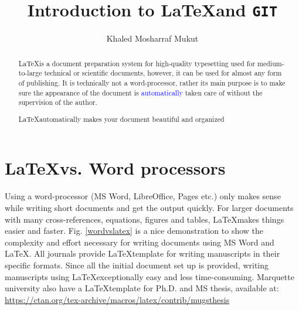 \documentclass[a4paper, 12pt, one column]{article}
\title{Introduction to \LaTeX \space and \texttt{GIT}}
\author{Khaled Mosharraf Mukut}
\begin{document}
\maketitle

\begin{abstract}

    \LaTeX is a document preparation system for high-quality typesetting used for medium-to-large technical or scientific documents, however,  it can be used for almost any form of publishing. It is technically not a word-processor, rather its main purpose is to make sure the appearance of the document is \textcolor{blue}{automatically} taken care of without the supervision of the author. 
    
    \vspace{0.3cm}

     {
            {
            \begin{minipage}{0.8\textwidth}
                \centering
               \LaTeX \space automatically makes your document beautiful and organized 
            \end{minipage}
            }
        }

\end{abstract}

\section{\LaTeX\space vs. Word processors}
\begin{linenumbers}

Using a word-processor (MS Word, LibreOffice,  Pages etc.) only makes sense while writing short documents and get the output quickly. For larger documents with many cross-references, equations,  figures and tables, \LaTeX \space makes things easier and faster. Fig. \ref{wordvslatex} is a nice demonstration to show the complexity and effort necessary for writing documents using MS Word and \LaTeX  \cite{BibEntry2020Apr}. All journals provide \LaTeX \space template for writing manuscripts in their specific formats. Since all the initial document set up is provided,  writing manuscripts using \LaTeX \space exceptionally easy and less time-consuming. Marquette university also have a \LaTeX \space template for Ph.D. and MS thesis, available at: \textcolor{blue}{\url{https://ctan.org/tex-archive/macros/latex/contrib/mugsthesis}}

\end{linenumbers}
\end{document}
